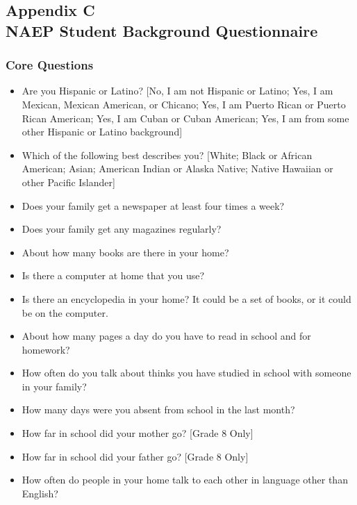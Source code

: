 \documentclass[letterpaper,12p,twoside]{article} %
\begin{document}
\subsection*{Appendix C\\NAEP Student Background Questionnaire}
\label{appendixDemographics}
\begin{singlespace}
\subsubsection{Core Questions}
\begin{itemize}
	\item Are you Hispanic or Latino? [No, I am not Hispanic or Latino; Yes, I am Mexican, Mexican American, or Chicano; Yes, I am Puerto Rican or Puerto Rican American; Yes, I am Cuban or Cuban American; Yes, I am from some other Hispanic or Latino background]
	\item Which of the following best describes you? [White; Black or African American; Asian; American Indian or Alaska Native; Native Hawaiian or other Pacific Islander]
	\item Does your family get a newspaper at least four times a week?
	\item Does your family get any magazines regularly?
	\item About how many books are there in your home?
	\item Is there a computer at home that you use?
	\item Is there an encyclopedia in your home? It could be a set of books, or it could be on the computer.
	\item About how many pages a day do you have to read in school and for homework?
	\item How often do you talk about thinks you have studied in school with someone in your family?
	\item How many days were you absent from school in the last month?
	\item How far in school did your mother go? [Grade 8 Only]
	\item How far in school did your father go? [Grade 8 Only]
	\item How often do people in your home talk to each other in language other than English?
\end{itemize}


\end{singlespace}
\end{document}
